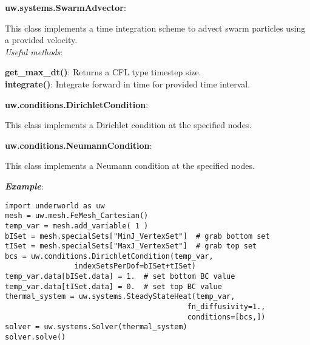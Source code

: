 \documentclass[10pt,landscape]{article}
\begin{document}
\begin{multicols}{2}
\noindent\textbf{uw.systems.SwarmAdvector}:
\begin{addmargin}[1em]{2em}
This class implements a time integration scheme to advect swarm particles using a provided velocity.\\
\vspace{1mm}
\textit{Useful methods}:\\
\begin{addmargin}[1em]{2em}
\textbf{get\_max\_dt()}: Returns a CFL type timestep size.\\
\textbf{integrate()}: Integrate forward in time for provided time interval.\\
\end{addmargin}
\end{addmargin}
\vspace{1mm}

\noindent\textbf{uw.conditions.DirichletCondition}:
\begin{addmargin}[1em]{2em}
This class implements a Dirichlet condition at the specified nodes.
\end{addmargin}
\vspace{1mm}

\noindent\textbf{uw.conditions.NeumannCondition}:
\begin{addmargin}[1em]{2em}
This class implements a Neumann condition at the specified nodes.
\end{addmargin}

\vspace{2mm}
\noindent\textbf{\textit{Example}}:
\begin{lstlisting}
import underworld as uw
mesh = uw.mesh.FeMesh_Cartesian()
temp_var = mesh.add_variable( 1 )
bISet = mesh.specialSets["MinJ_VertexSet"]  # grab bottom set
tISet = mesh.specialSets["MaxJ_VertexSet"]  # grab top set
bcs = uw.conditions.DirichletCondition(temp_var,
                indexSetsPerDof=bISet+tISet)
temp_var.data[bISet.data] = 1.  # set bottom BC value
temp_var.data[tISet.data] = 0.  # set top BC value
thermal_system = uw.systems.SteadyStateHeat(temp_var,
                                          fn_diffusivity=1.,
                                          conditions=[bcs,])
solver = uw.systems.Solver(thermal_system)
solver.solve()
\end{lstlisting}


\end{multicols}
\end{document}
